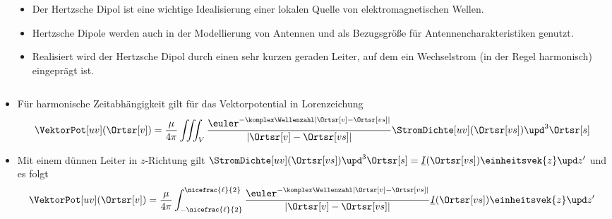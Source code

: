 \begin{frame}
\begin{columns}
\begin{column}{.35\textwidth}
\begin{tikzpicture}[scale=5,tdplot_main_coords]
\end{tikzpicture}
\end{column}
\begin{column}{.65\textwidth}
  \begin{itemize}[<+->]
  \item Der \alert{Hertzsche Dipol} ist eine wichtige Idealisierung einer lokalen Quelle von elektromagnetischen Wellen.
    \item Hertzsche Dipole werden auch in der Modellierung von Antennen und als Bezugsgröße für Antennencharakteristiken genutzt.
    \item Realisiert wird der Hertzsche Dipol durch einen sehr kurzen geraden Leiter, auf dem ein Wechselstrom (in der Regel harmonisch) eingeprägt ist.
      \end{itemize}
\end{column}
\end{columns}
  \begin{itemize}[<+->]
    \item Für harmonische Zeitabhängigkeit gilt für das Vektorpotential in Lorenzeichung
      \begin{equation*}
        \VektorPot[uv](\Ortsr[v]) = \frac{\mu}{4\pi} \iiint_V \frac{\euler^{-\komplex\Wellenzahl|\Ortsr[v]-\Ortsr[vs]|}}{|\Ortsr[v]-\Ortsr[vs]|} \StromDichte[uv](\Ortsr[vs]) \upd^3 \Ortsr[s]
        \end{equation*}
    \item Mit einem \alert{dünnen Leiter} in \(z\)-Richtung gilt \(\StromDichte[uv](\Ortsr[vs]) \upd^3 \Ortsr[s] = \underline{I}(\Ortsr[vs])\einheitsvek{z}\upd z^\prime \) und es folgt
      \begin{equation*}
        \VektorPot[uv](\Ortsr[v]) = \frac{\mu}{4\pi} \int_{-\nicefrac{\ell}{2}}^{\nicefrac{\ell}{2}} \frac{\euler^{-\komplex\Wellenzahl |\Ortsr[v]-\Ortsr[vs]|}}{|\Ortsr[v]-\Ortsr[vs]|} \underline{I}(\Ortsr[vs])\einheitsvek{z}\upd z^\prime
        \end{equation*}
\end{itemize}
\end{frame}


